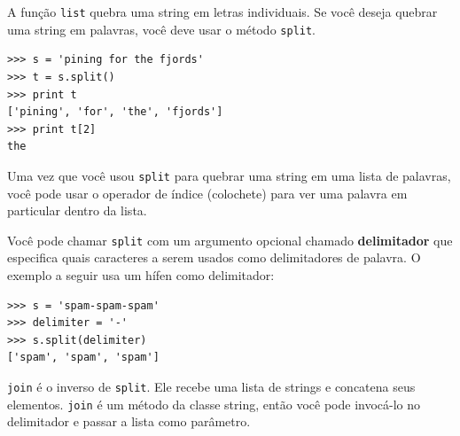 A função {\tt list} quebra uma string em letras individuais. Se você deseja quebrar
uma string em palavras, você deve usar o método {\tt split}.


\beforeverb
\begin{verbatim}
>>> s = 'pining for the fjords'
>>> t = s.split()
>>> print t
['pining', 'for', 'the', 'fjords']
>>> print t[2]
the
\end{verbatim}
\afterverb
%

Uma vez que você usou {\tt split} para quebrar uma string em uma lista
de palavras, você pode usar o operador de índice (colochete) para ver
uma palavra em particular dentro da lista.

Você pode chamar {\tt split} com um argumento opcional chamado {\bf delimitador}
que especifica quais caracteres a serem usados como delimitadores de palavra.
O exemplo a seguir usa um hífen como delimitador:


\beforeverb
\begin{verbatim}
>>> s = 'spam-spam-spam'
>>> delimiter = '-'
>>> s.split(delimiter)
['spam', 'spam', 'spam']
\end{verbatim}
\afterverb
%

{\tt join} é o inverso de {\tt split}. Ele recebe uma lista de strings e
concatena seus elementos. {\tt join} é um método da classe string, então você pode invocá-lo
no delimitador e passar a lista como parâmetro.

